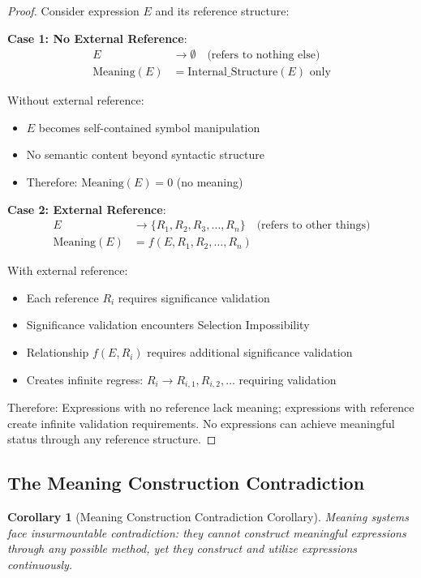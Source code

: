 \documentclass[12pt,a4paper]{article}
\newtheorem{corollary}[theorem]{Corollary}
\begin{document}
\begin{proof}
Consider expression $E$ and its reference structure:

\textbf{Case 1: No External Reference}:
\begin{align}
E &\rightarrow \emptyset \quad \text{(refers to nothing else)} \\
\text{Meaning}(E) &= \text{Internal\_Structure}(E) \text{ only}
\end{align}

Without external reference:
\begin{itemize}
\item $E$ becomes self-contained symbol manipulation
\item No semantic content beyond syntactic structure
\item Therefore: $\text{Meaning}(E) = 0$ (no meaning)
\end{itemize}

\textbf{Case 2: External Reference}:
\begin{align}
E &\rightarrow \{R_1, R_2, R_3, \ldots, R_n\} \quad \text{(refers to other things)} \\
\text{Meaning}(E) &= f(E, R_1, R_2, \ldots, R_n)
\end{align}

With external reference:
\begin{itemize}
\item Each reference $R_i$ requires significance validation
\item Significance validation encounters Selection Impossibility
\item Relationship $f(E, R_i)$ requires additional significance validation
\item Creates infinite regress: $R_i \rightarrow R_{i,1}, R_{i,2}, \ldots$ requiring validation
\end{itemize}

Therefore: Expressions with no reference lack meaning; expressions with reference create infinite validation requirements. No expressions can achieve meaningful status through any reference structure.
\end{proof}

\subsection{The Meaning Construction Contradiction}

\begin{corollary}[Meaning Construction Contradiction Corollary]
Meaning systems face insurmountable contradiction: they cannot construct meaningful expressions through any possible method, yet they construct and utilize expressions continuously.
\end{corollary}
\end{document}

